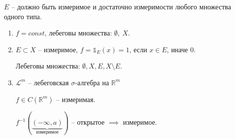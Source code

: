 \begin{remark}
    $E$ -- должно быть измеримое и достаточно измеримости любого множества одного типа.    
\end{remark}

\begin{example}
    \begin{enumerate}
        \item {
            $f = const$, лебеговы множества: $\emptyset, \ X$.
        }
        \item {
            $E \subset X$ -- измеримое, $f = \mathbb{1}_E(x) = 1$, если $x \in E$, иначе $0$.

            Лебеговы множества: $\emptyset, X, E, X \setminus E$.
        }
        \item {
            $\mathscr{L}^m$ -- лебеговская $\sigma$-алгебра на $\mathbb{R}^m$

            $f \in C(\mathbb{R}^m)$ -- измеримая.

            $f^{-1}(\underbrace{(-\infty, a)}_{\text{измеримое}})$ -- открытое $\implies$ измеримое.
        }
    \end{enumerate}
\end{example}


